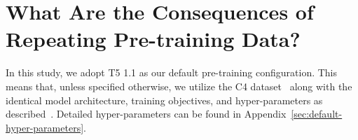 \documentclass{article}
\def\revise{\textcolor{red}}
\newcommand{\yao}[1]{{\color{cyan} YF: #1}}
\begin{document}


\section{What Are the Consequences of Repeating Pre-training Data?}\label{sec:consequnce}



In this study, we adopt T5 1.1 
as our default pre-training configuration. This means that, unless specified otherwise, we utilize the C4 dataset~\citep{2020t5} along with the identical model architecture, training objectives, and hyper-parameters as described~\citep{2020t5}. Detailed hyper-parameters can be found in Appendix~\ref{sec:default-hyper-parameters}.
\end{document}
